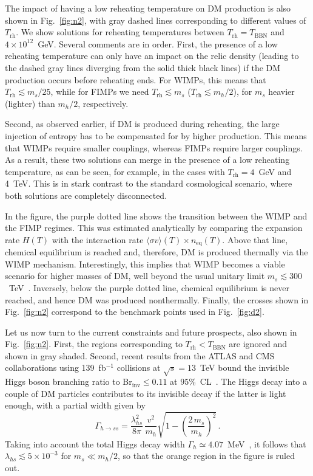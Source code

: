 \documentclass[a4paper,11pt]{article}
\newcommand{\lhs}{\lambda_{hs}}
\newcommand{\mdm}{m_s}
\newcommand{\Trh}{T_\text{rh}}
\newcommand{\sv}{\langle\sigma v\rangle}
\begin{document}
The impact of having a low reheating temperature on DM production is also shown in Fig.~\ref{fig:n2}, with gray dashed lines corresponding to different values of $\Trh$. We show solutions for reheating temperatures between $\Trh = T_\text{BBN}$ and $4 \times 10^{12}$~GeV. Several comments are in order. First, the presence of a low reheating temperature can only have an impact on the relic density (leading to the dashed gray lines diverging from the solid thick black lines) if the DM production occurs before reheating ends. For WIMPs, this means that $\Trh \lesssim \mdm/25$, while for FIMPs we need $\Trh \lesssim \mdm$ ($\Trh \lesssim m_h/2$), for $\mdm$ heavier (lighter) than $m_h/2$, respectively.

Second, as observed earlier, if DM is produced during reheating, the large injection of entropy has to be compensated for by higher production. This means that WIMPs require smaller couplings, whereas FIMPs require larger couplings. As a result, these two solutions can merge in the presence of a low reheating temperature, as can be seen, for example, in the cases with $\Trh = 4$~GeV and 4~TeV. This is in stark contrast to the standard cosmological scenario, where both solutions are completely disconnected.

In the figure, the purple dotted line shows the transition between the WIMP and the FIMP regimes. This was estimated analytically by comparing the expansion rate $H(T)$ with the interaction rate $\sv(T) \times n_\text{eq}(T)$.
Above that line, chemical equilibrium is reached and, therefore, DM is produced thermally via the WIMP mechanism.
Interestingly, this implies that WIMP becomes a viable scenario for higher masses of DM, well beyond the usual unitary limit $\mdm \lesssim 300$~TeV~\cite{Griest:1989wd, Smirnov:2019ngs, Bhatia:2020itt}.
Inversely, below the purple dotted line, chemical equilibrium is never reached, and hence DM was produced nonthermally.
Finally, the crosses shown in Fig.~\ref{fig:n2} correspond to the benchmark points used in Fig.~\ref{fig:d2}.

Let us now turn to the current constraints and future prospects, also shown in Fig.~\ref{fig:n2}.
First, the regions corresponding to $\Trh < T_\text{BBN}$ are ignored and shown in gray shaded.
Second, recent results from the ATLAS and CMS collaborations using 139~fb$^{-1}$ collisions at $\sqrt{s} = 13$~TeV bound the invisible Higgs boson branching ratio to Br$_\text{inv}\leq 0.11$ at $95\%$~CL~\cite{ATLAS:2022yvh, ATLAS:2023tkt, CMS:2023sdw}.
The Higgs decay into a couple of DM particles contributes to its invisible decay if the latter is light enough, with a partial width given by
\begin{equation}
    \Gamma_{h\to ss} = \dfrac{\lhs^2}{8\pi}\, \dfrac{v^2}{m_h} \sqrt{1 - \left(\dfrac{2\, \mdm}{m_h}\right)^2}\,.
\end{equation}
Taking into account the total Higgs decay width $\Gamma_h\simeq 4.07$~MeV~\cite{Djouadi:2005gi, ATLAS:2023tkt}, it follows that $\lhs \lesssim 5\times10^{-3}$ for $\mdm \ll m_h/2$, so that the orange region in the figure is ruled out.
\end{document}
